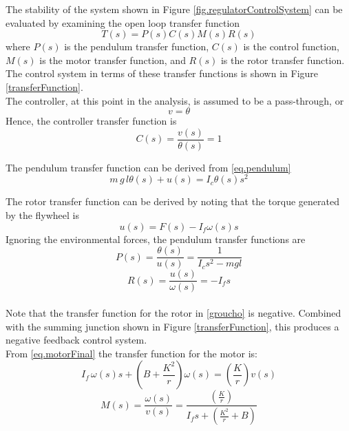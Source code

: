 \documentclass[12pt,letterpaper]{article}
\begin{document}
The stability of the system shown in Figure  \ref{fig.regulatorControlSystem} can be evaluated by examining the
open loop transfer function
\begin{equation}
    T(s) = P(s) C(s) M(s) R(s)
\end{equation}
where $P(s)$ is the pendulum transfer function, $C(s)$ is the control function, $M(s)$ is the motor transfer function, and $R(s)$ is the rotor transfer function.  
The control system in terms of these transfer functions is shown in Figure \ref{transferFunction}.\\


The controller, at this point in the analysis, is assumed to be a pass-through, or
%
\begin{equation}
v = \theta
\end{equation}
Hence, the controller transfer function is
\begin{equation}
C(s) = \frac{v(s)}{\theta(s)} = 1
    \label{EQ.simpleController}
\end{equation}

The pendulum transfer function can be derived from \eqref{eq.pendulum}
%
\begin{equation}
    m \,g \,l \theta(s) + u(s) = I_{c}\theta(s) s^{2}
\end{equation}

The rotor transfer function can be derived by noting that the torque generated by the flywheel is
\begin{equation}
    u(s) = F(s) - I_{f}\omega(s) s
\end{equation}
%
Ignoring the environmental forces, the pendulum transfer functions are 
\begin{equation}
    P(s) = \frac{\theta(s)}{u(s)}= \frac{1}{I_{c} s^{2} - m g l }
    \label{franco}
\end{equation}
%
\begin{equation}
    R(s) = \frac{u(s)}{\omega(s)} = -I_{f} s
    \label{groucho}
\end{equation}\\

Note that the transfer function for the rotor in \eqref{groucho} is negative.  Combined with the summing
junction shown in Figure \ref{transferFunction}, this produces a negative feedback control system.\\
 


From \eqref{eq.motorFinal} the transfer function for the motor is:
\begin{equation}
    I_{f} \, \omega(s) s + \left( B+\frac{K^2}{r} \right) \omega(s) = \left(\frac{K} {r}\right)v(s)
\end{equation}
\begin{equation}
    M(s) = \frac{\omega(s)}{v(s)} =  \frac{\left(\frac{K} {r}\right)}{I_{f} s + (\frac{K^2}{r}+B)}
    \label{rondo}
\end{equation} 
\end{document}
